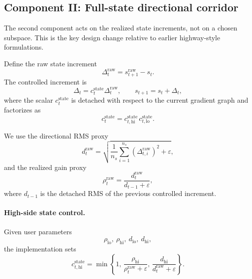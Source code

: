 \documentclass[11pt]{article}
\newcommand{\1}{\mathbf{1}}
\begin{document}
\subsection{Component II: Full-state directional corridor}
The second component acts on the realized state increments, not on a chosen subspace. This is the key design change relative to earlier highway-style formulations.

Define the raw state increment
\begin{equation}
  \Delta_t^{\mathrm{raw}} = s_{t+1}^{\mathrm{raw}} - s_t.
\end{equation}
The controlled increment is
\begin{equation}
  \Delta_t = c_t^{\mathrm{state}} \Delta_t^{\mathrm{raw}}, \qquad
  s_{t+1} = s_t + \Delta_t,
\end{equation}
where the scalar $c_t^{\mathrm{state}}$ is detached with respect to the current gradient graph and factorizes as
\begin{equation}
  c_t^{\mathrm{state}} = c_{t,\mathrm{hi}}^{\mathrm{state}} \, c_{t,\mathrm{lo}}^{\mathrm{state}}.
\end{equation}

We use the directional RMS proxy
\begin{equation}
  d_t^{\mathrm{raw}} = \sqrt{\frac{1}{n_s}\sum_{i=1}^{n_s} (\Delta_{t,i}^{\mathrm{raw}})^2 + \varepsilon},
\end{equation}
and the realized gain proxy
\begin{equation}
  \rho_t^{\mathrm{raw}} = \frac{d_t^{\mathrm{raw}}}{d_{t-1} + \varepsilon},
\end{equation}
where $d_{t-1}$ is the detached RMS of the previous controlled increment.

\paragraph{High-side state control.}
Given user parameters
\[
  \rho_{\mathrm{lo}},\ \rho_{\mathrm{hi}},\ d_{\mathrm{lo}},\ d_{\mathrm{hi}},
\]
the implementation sets
\begin{equation}
  c_{t,\mathrm{hi}}^{\mathrm{state}}
  =
  \min\!\left\{
    1,\,
    \frac{\rho_{\mathrm{hi}}}{\rho_t^{\mathrm{raw}} + \varepsilon},\,
    \frac{d_{\mathrm{hi}}}{d_t^{\mathrm{raw}} + \varepsilon}
  \right\}.
\end{equation}
\end{document}
